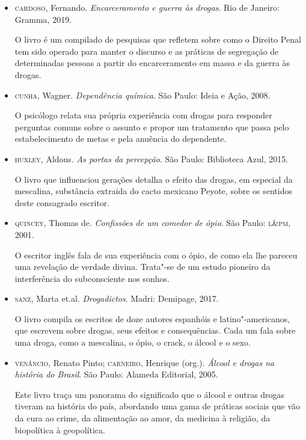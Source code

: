 \documentclass{article}
\begin{document}
\begin{itemize}
\item\textsc{cardoso}, Fernando. \textit{Encarceramento e guerra às drogas}. Rio de
Janeiro: Gramma, 2019.

O livro é um compilado de pesquisas que refletem sobre como o Direito
Penal tem sido operado para manter o discurso e as práticas de
segregação de determinadas pessoas a partir do encarceramento em massa e
da guerra às drogas.

\item\textsc{cunha}, Wagner. \textit{Dependência química}. São Paulo: Ideia e Ação,
2008.

O psicólogo relata sua própria experiência com drogas para responder
perguntas comuns sobre o assunto e propor um tratamento que passa pelo
estabelecimento de metas e pela anuência do dependente.

\item\textsc{huxley}, Aldous. \textit{As portas da percepção}. São Paulo: Biblioteca
Azul, 2015.

O livro que influenciou gerações detalha o efeito das drogas, em especial da mescalina, substância extraida do cacto mexicano Peyote, sobre os
sentidos deste consagrado escritor.

\item\textsc{quincey}, Thomas de. \textit{Confissões de um comedor de ópio}. São Paulo: \textsc{l\&pm}, 2001.

O escritor inglês fala de sua experiência com o ópio, de como ela lhe
pareceu uma revelação de verdade divina. Trata"-se de um estudo pioneiro
da interferência do subconsciente nos sonhos.

\item\textsc{sanz}, Marta et.al. \textit{Drogadictos}. Madri: Demipage, 2017.

O livro compila os escritos de doze autores espanhóis e
latino"-americanos, que escrevem sobre drogas, seus efeitos e
consequências. Cada um fala sobre uma droga, como a mescalina, o ópio, o
crack, o álcool e o sexo.

\item\textsc{venâncio}, Renato Pinto; \textsc{carneiro}, Henrique (org.). \textit{Álcool e drogas na história do Brasil}. São Paulo: Alameda Editorial, 2005.

Este livro traça um panorama do significado que o álcool e outras drogas
tiveram na história do país, abordando uma gama de práticas sociais que
vão da cura ao crime, da alimentação ao amor, da medicina à religião, da
biopolítica à geopolítica.
\end{itemize}
\end{document}
